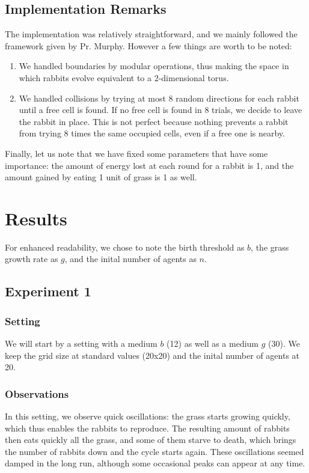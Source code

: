 \documentclass[11pt]{article}
\begin{document}
\subsection{Implementation Remarks}
The implementation was relatively straightforward, and we mainly followed the framework given by Pr. Murphy. However a few things are worth to be noted:
\begin{enumerate}
\item We handled boundaries by modular operations, thus making the space in which rabbits evolve equivalent to a 2-dimensional torus.
\item We handled collisions by trying at most 8 random directions for each rabbit until a free cell is found. If no free cell is found in 8 trials, we decide to leave the rabbit in place. This is not perfect because nothing prevents a rabbit from trying 8 times the same occupied cells, even if a free one is nearby. 
\end{enumerate}
Finally, let us note that we have fixed some parameters that have some importance: the amount of energy lost at each round for a rabbit is 1, and the amount gained by eating 1 unit of grass is 1 as well.

\section{Results}
For enhanced readability, we chose to note the birth threshold as $b$, the grass growth rate as $g$, and the inital number of agents as $n$.

\subsection{Experiment 1}

\subsubsection{Setting}
We will start by a setting with a medium $b$ (12) as well as a medium $g$ (30). We keep the grid size at standard values (20x20) and the inital number of agents at 20.

\subsubsection{Observations}
In this setting, we observe quick oscillations: the grass starts growing quickly, which thus enables the rabbits to reproduce. The resulting amount of rabbits then eats quickly all the grass, and some of them starve to death, which brings the number of rabbits down and the cycle starts again. These oscillations seemed damped in the long run, although some occasional peaks can appear at any time.
\end{document}
